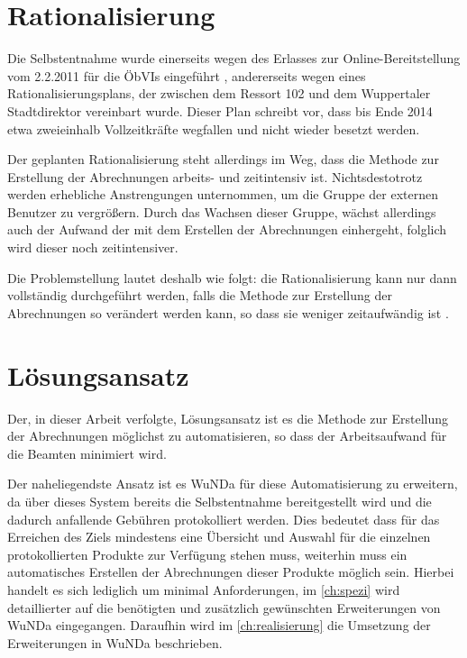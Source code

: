 \section{Rationalisierung} \label{sec:rationalisierung}
Die Selbstentnahme wurde einerseits wegen des Erlasses zur Online-Bereitstellung vom 2.2.2011 für die \acp{ÖbVI} eingeführt \autocite[vgl.][]{wupp-wunda-oebvi}, andererseits wegen eines Rationalisierungsplans, der zwischen dem Ressort 102 und dem Wuppertaler Stadtdirektor vereinbart wurde.
Dieser Plan schreibt vor, dass bis Ende 2014 etwa zweieinhalb  Vollzeitkräfte wegfallen und nicht wieder besetzt werden.

Der geplanten Rationalisierung steht allerdings im Weg, dass die Methode zur Erstellung der Abrechnungen arbeits- und zeitintensiv ist.
Nichtsdestotrotz werden erhebliche Anstrengungen unternommen, um die Gruppe der externen Benutzer zu vergrößern.
Durch das Wachsen dieser Gruppe, wächst allerdings auch der Aufwand der mit dem Erstellen der Abrechnungen einhergeht, folglich wird dieser noch zeitintensiver.

Die Problemstellung lautet deshalb wie folgt: die Rationalisierung kann nur dann vollständig durchgeführt werden, falls die Methode zur Erstellung der Abrechnungen so verändert werden kann, so dass sie weniger zeitaufwändig ist \autocite[vgl.][]{sander-abrechnung}. 


\section{Lösungsansatz}

Der, in dieser Arbeit verfolgte, Lösungsansatz ist es die Methode zur Erstellung der Abrechnungen möglichst zu automatisieren, so dass der Arbeitsaufwand für die Beamten minimiert wird. 

Der naheliegendste Ansatz ist es \acs{WuNDa} für diese Automatisierung zu erweitern, da über dieses System bereits die Selbstentnahme bereitgestellt wird und die dadurch anfallende Gebühren protokolliert werden. Dies bedeutet dass für das Erreichen des Ziels mindestens eine Übersicht und Auswahl für die einzelnen protokollierten Produkte zur Verfügung stehen muss, weiterhin muss ein automatisches Erstellen der Abrechnungen dieser Produkte möglich sein. Hierbei handelt es sich lediglich um minimal Anforderungen, im \autoref{ch:spezi} wird detaillierter auf die benötigten und zusätzlich gewünschten Erweiterungen von \ac{WuNDa} eingegangen. Daraufhin wird im \autoref{ch:realisierung} die Umsetzung der Erweiterungen in \ac{WuNDa} beschrieben.

